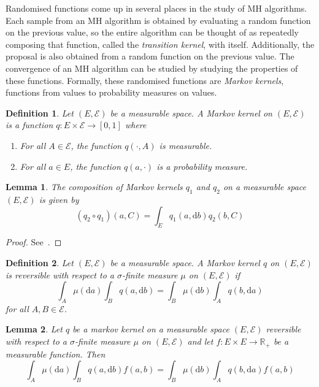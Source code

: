 \documentclass[english,twoside,openright]{HYgraduMLDS}
\newtheorem{lemma}{Lemma}
\newtheorem{definition}{Definition}
\newcommand{\R}{\mathbb{R}}
\newcommand{\dx}{\mathrm{d}}
\begin{document}
Randomised functions come up in several places in the study of MH algorithms.
Each sample from an MH algorithm is obtained by evaluating a random function
on the previous value, so the entire algorithm can be thought of as repeatedly
composing that function, called the \emph{transition kernel}, with itself.
Additionally, the proposal is also obtained
from a random function on the previous value. The convergence of an MH
algorithm can be studied by studying the properties of these functions.
Formally, these randomised functions are \emph{Markov kernels},
functions from values to probability measures on values.

\begin{definition}
	Let \((E, \mathcal{E})\) be a measurable space. A Markov kernel on
  \((E, \mathcal{E})\) is a function \(q\colon E\times \mathcal{E}\to [0, 1]\)
  where
  \begin{enumerate}
    \item For all \(A\in \mathcal{E}\), the function \(q(\cdot, A)\) is
          measurable.
    \item
          For all \(a\in E\), the function \(q(a, \cdot)\) is a probability
          measure.
  \end{enumerate}
\end{definition}

\begin{lemma}\label{markov_kernel_composition_lemma}
	The composition of Markov kernels \(q_{1}\) and \(q_{2}\) on a measurable space
  \((E, \mathcal{E})\) is given by
  \[
    (q_{2}\circ q_{1})(a, C) = \int_{E}q_{1}(a, \dx b)q_{2}(b, C)
  \]
\end{lemma}
\begin{proof}
	See~\cite[Equation 6.5]{Cin11}.
\end{proof}

\begin{definition}\label{reversible_definition}
	Let \((E, \mathcal{E})\) be a measurable space. A Markov kernel \(q\) on
  \((E, \mathcal{E})\) is reversible with respect to a \(\sigma\)-finite
  measure \(\mu\) on \((E, \mathcal{E})\)
  if
  \[
    \int_{A}\mu(\dx a)\int_{B}q(a, \dx b) = \int_{B}\mu(\dx b)\int_{A}q(b, \dx a)
  \]
  for all \(A, B\in \mathcal{E}\).
\end{definition}

\begin{lemma}\label{reversible_integration_lemma}
  Let \(q\) be a markov kernel on a measurable space \((E, \mathcal{E})\)
  reversible with respect to a \(\sigma\)-finite measure \(\mu\) on
  \((E, \mathcal{E})\) and let \(f\colon E\times E\to \R_{+}\) be a
  measurable function. Then
  \[
    \int_{A}\mu(\dx a)\int_{B}q(a, \dx b)f(a, b)
    = \int_{B}\mu(\dx b)\int_{A}q(b, \dx a)f(a, b)
  \]
\end{lemma}
\end{document}
